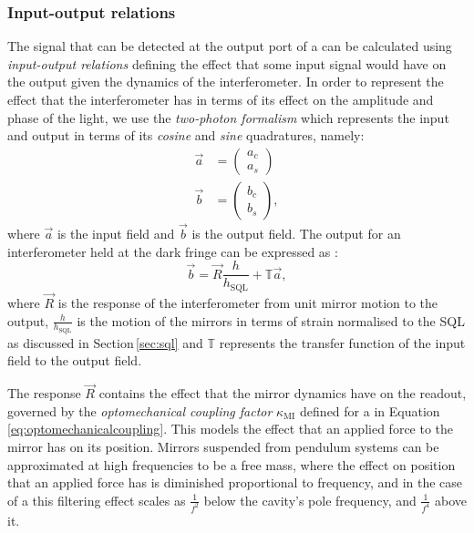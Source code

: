 \subsubsection{Input-output relations}
The signal that can be detected at the output port of a \FPMI{} can be calculated using \emph{input-output relations} defining the effect that some input signal would have on the output given the dynamics of the interferometer. In order to represent the effect that the interferometer has in terms of its effect on the amplitude and phase of the light, we use the \emph{two-photon formalism} \cite{Caves1985, Schumaker1985} which represents the input and output in terms of its \emph{cosine} and \emph{sine} quadratures, namely:
\begin{align}
  \vec{a} &=
  \begin{pmatrix}
    a_c \\
    a_s
  \end{pmatrix} \\
  \vec{b} &=
  \begin{pmatrix}
    b_c \\
    b_s
  \end{pmatrix},
\end{align}
where $\vec{a}$ is the input field and $\vec{b}$ is the output field. The output for an interferometer held at the dark fringe can be expressed as \cite{Danilishin2015}:
\begin{equation}
  \label{eq:ifo-output-signal}
  \vec{b} = \vec{R} \frac{h}{h_{\text{SQL}}} + \mathbb{T} \vec{a},
\end{equation}
where $\vec{R}$ is the response of the interferometer from unit mirror motion to the output, $\frac{h}{h_{\text{SQL}}}$ is the motion of the mirrors in terms of strain normalised to the \gls{SQL} as discussed in Section\,\ref{sec:sql} and $\mathbb{T}$ represents the transfer function of the input field to the output field.

The response $\vec{R}$ contains the effect that the mirror dynamics have on the readout, governed by the \emph{optomechanical coupling factor} $\kappa_{\text{MI}}$ defined for a \MI{} in Equation\,\ref{eq:optomechanicalcoupling}. This models the effect that an applied force to the mirror has on its position. Mirrors suspended from pendulum systems can be approximated at high frequencies to be a free mass, where the effect on position that an applied force has is diminished proportional to frequency, and in the case of a \FPMI{} this filtering effect scales as $\frac{1}{f^2}$ below the cavity's pole frequency, and $\frac{1}{f^4}$ above it.

